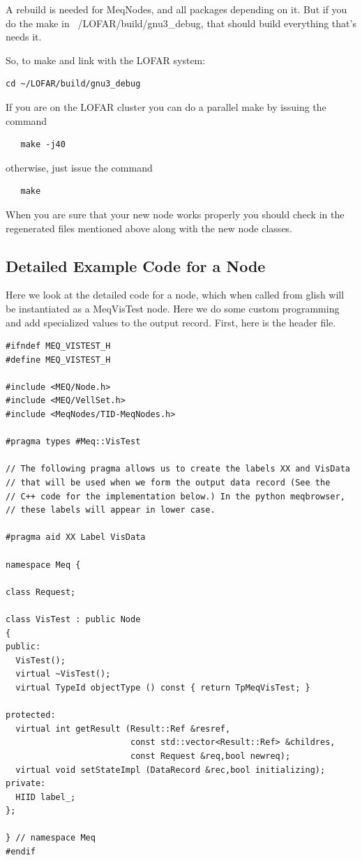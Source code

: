 \documentclass[10pt]{article}
\begin{document}
A rebuild is needed for MeqNodes, and all packages depending on it. But
if you do the make in ~/LOFAR/build/gnu3\_debug, that should build
everything that's needs it.

So, to make and link with the LOFAR system:

\begin{verbatim}
cd ~/LOFAR/build/gnu3_debug
\end{verbatim}

If you are on the LOFAR cluster you can do a parallel make by
issuing the command

\begin{verbatim}
   make -j40 
\end{verbatim}

otherwise, just issue the command

\begin{verbatim}
   make
\end{verbatim}

When you are sure that your new node works properly you should check in 
the regenerated files mentioned above along with the new node classes.

\subsection {Detailed Example Code for a Node}

Here we look at the detailed code for a node, which when called from
glish will be instantiated as a MeqVisTest node. Here we do some custom
programming and add specialized values to the output record. First, here
is the header file.

\begin{verbatim}
#ifndef MEQ_VISTEST_H
#define MEQ_VISTEST_H
    
#include <MEQ/Node.h>
#include <MEQ/VellSet.h>
#include <MeqNodes/TID-MeqNodes.h>

#pragma types #Meq::VisTest

// The following pragma allows us to create the labels XX and VisData
// that will be used when we form the output data record (See the
// C++ code for the implementation below.) In the python meqbrowser, 
// these labels will appear in lower case.

#pragma aid XX Label VisData

namespace Meq {

class Request;

class VisTest : public Node
{
public:
  VisTest();
  virtual ~VisTest();
  virtual TypeId objectType () const { return TpMeqVisTest; }

protected:
  virtual int getResult (Result::Ref &resref, 
                         const std::vector<Result::Ref> &childres,
                         const Request &req,bool newreq);
  virtual void setStateImpl (DataRecord &rec,bool initializing);
private:
  HIID label_;
};

} // namespace Meq
#endif
\end{verbatim}
\end{document}
